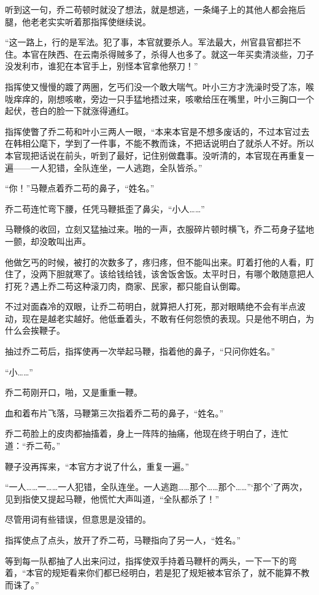 听到这一句，乔二苟顿时就没了想法，就是想逃，一条绳子上的其他人都会拖后腿，他老老实实听着那指挥使继续说。

“这一路上，行的是军法。犯了事，本官就要杀人。军法最大，州官县官都拦不住。本官在陕西、在云南杀得贼多了，杀得人也多了。就这一年买卖清淡些，刀子没发利市，谁犯在本官手上，别怪本官拿他祭刀！”

指挥使又慢慢的踱了两圈，乞丐们没一个敢大喘气。叶小三方才洗澡时受了冻，喉咙痒痒的，刚想咳嗽，旁边一只手猛地捂过来，咳嗽给压在嘴里，叶小三胸口一个起伏，苍白的脸一下就涨得通红。

指挥使瞥了乔二苟和叶小三两人一眼，“本来本官是不想多废话的，不过本官过去在韩相公麾下，学到了一件事，不能不教而诛，不把话说明白了就杀人不好。所以本官现把话说在前头，听到了最好，记住别做蠢事。没听清的，本官现在再重复一遍——一人犯错，全队连坐，一人逃跑，全队皆杀。”

“你！”马鞭点着乔二苟的鼻子，“姓名。”

乔二苟连忙弯下腰，任凭马鞭抵歪了鼻尖，“小人……”

马鞭倏的收回，立刻又猛抽过来。啪的一声，衣服碎片顿时横飞，乔二苟身子猛地一颤，却没敢叫出声。

他做乞丐的时候，被打的次数多了，疼归疼，但不能叫出来。盯着打他的人看，盯住了，没两下胆就寒了。该给钱给钱，该舍饭舍饭。太平时日，有哪个敢随意把人打死？遇上乔二苟这种滚刀肉，商家、民家，都只能自认倒霉。

不过对面森冷的双眼，让乔二苟明白，就算把人打死，那对眼睛绝不会有半点波动，现在是越老实越好。他低垂着头，不敢有任何怨愤的表现。只是他不明白，为什么会挨鞭子。

抽过乔二苟后，指挥使再一次举起马鞭，指着他的鼻子，“只问你姓名。”

“小……”

乔二苟刚开口，啪，又是重重一鞭。

血和着布片飞落，马鞭第三次指着乔二苟的鼻子，“姓名。”

乔二苟脸上的皮肉都抽搐着，身上一阵阵的抽痛，他现在终于明白了，连忙道：“乔二苟。”

鞭子没再挥来，“本官方才说了什么，重复一遍。”

“一人……一……一人犯错，全队连坐。一人逃跑……那个……那个……”‘那个’了两次，见到指使又提起马鞭，他慌忙大声叫道，“全队都杀了！”

尽管用词有些错误，但意思是没错的。

指挥使点了点头，放开了乔二苟，马鞭指向了另一人，“姓名。”

等到每一队都抽了人出来问过，指挥使双手持着马鞭杆的两头，一下一下的弯着，“本官的规矩看来你们都已经明白，若是犯了规矩被本官杀了，就不能算不教而诛了。”

